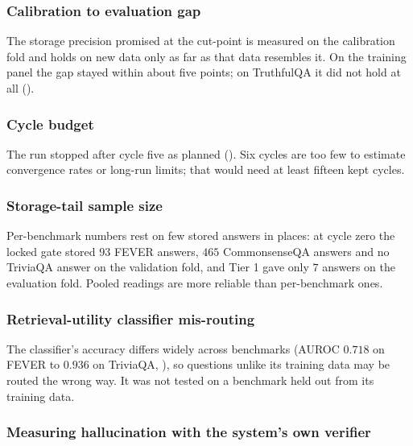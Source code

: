 \subsubsection{Calibration to evaluation gap}
\label{sec:disc-threat-gap}

The storage precision promised at the cut-point is measured on the calibration fold and holds on new data only as far as that data resembles it. On the training panel the gap stayed within about five points; on TruthfulQA it did not hold at all ().

\subsubsection{Cycle budget}
\label{sec:disc-threat-cycles}

The run stopped after cycle five as planned (). Six cycles are too few to estimate convergence rates or long-run limits; that would need at least fifteen kept cycles.

\subsubsection{Storage-tail sample size}
\label{sec:disc-threat-n}

Per-benchmark numbers rest on few stored answers in places: at cycle zero the locked gate stored $93$ FEVER answers, $465$ CommonsenseQA answers and no TriviaQA answer on the validation fold, and Tier 1 gave only $7$ answers on the evaluation fold. Pooled readings are more reliable than per-benchmark ones.

\subsubsection{Retrieval-utility classifier mis-routing}
\label{sec:disc-threat-ruc}

The classifier's accuracy differs widely across benchmarks (AUROC $0.718$ on FEVER to $0.936$ on TriviaQA, ), so questions unlike its training data may be routed the wrong way. It was not tested on a benchmark held out from its training data.

\subsubsection{Measuring hallucination with the system's own verifier}
\label{sec:disc-threat-verifier}

